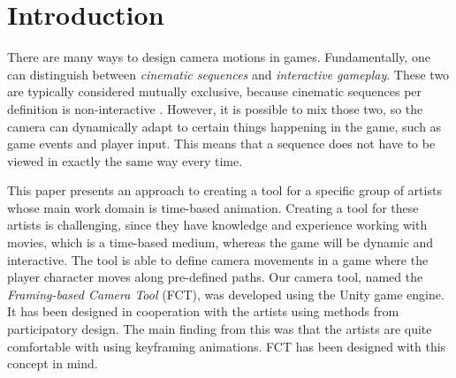 \section{Introduction}


There are many ways to design camera motions in games. Fundamentally, one can distinguish between \textit{cinematic sequences} and \textit{interactive gameplay}. These two are typically considered mutually exclusive, because cinematic sequences per definition is non-interactive \cite{haigh-hutchinson_real-time_2009}. However, it is possible to mix those two, so the camera can dynamically adapt to certain things happening in the game, such as game events and player input. This means that a sequence does not have to be viewed in exactly the same way every time.

This paper presents an approach to creating a tool for a specific group of artists whose main work domain is time-based animation. Creating a tool for these artists is challenging, since they have knowledge and experience working with movies, which is a time-based medium, whereas the game will be dynamic and interactive.  The tool is able to define camera movements in a game where the player character moves along pre-defined paths. Our camera tool, named the \textit{Framing-based Camera Tool} (FCT), was developed using the Unity game engine. It has been designed in cooperation with the artists using methods from participatory design. The main finding from this was that the artists are quite comfortable with using keyframing animations. FCT has been designed with this concept in mind.


